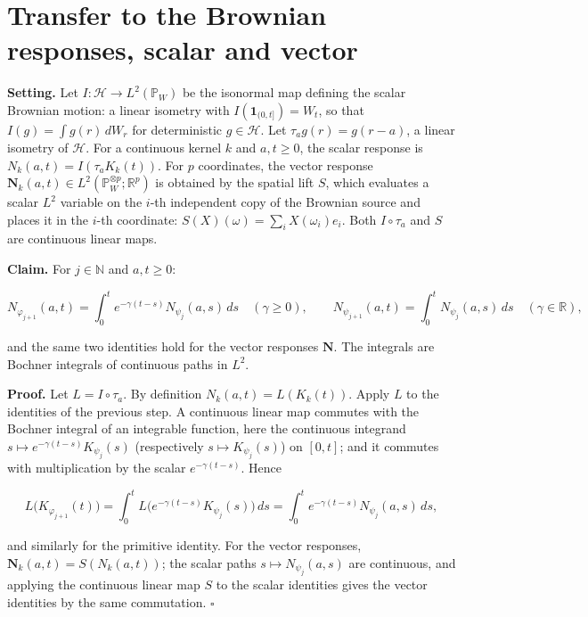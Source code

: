 \documentclass[11pt,a4paper]{article}
\begin{document}
\section{\texorpdfstring{Transfer to the Brownian responses, scalar and vector}{Transfer to the Brownian responses, scalar and vector}}


\textbf{Setting.} Let \(I:\mathcal H\to L^2(\mathbb P_W)\) be the isonormal map defining the scalar Brownian motion: a linear isometry with \(I(\mathbf 1_{(0,t]})=W_t\), so that \(I(g)=\int g(r)\,dW_r\) for deterministic \(g\in\mathcal H\). Let \(\tau_a g(r)=g(r-a)\), a linear isometry of \(\mathcal H\). For a continuous kernel \(k\) and \(a,t\ge0\), the scalar response is \(N_k(a,t)=I(\tau_aK_k(t))\). For \(p\) coordinates, the vector response \(\mathbf N_k(a,t)\in L^2(\mathbb P_W^{\otimes p};\mathbb R^p)\) is obtained by the spatial lift \(S\), which evaluates a scalar \(L^2\) variable on the \(i\)-th independent copy of the Brownian source and places it in the \(i\)-th coordinate: \(S(X)(\omega)=\sum_iX(\omega_i)e_i\). Both \(I\circ\tau_a\) and \(S\) are continuous linear maps.




\textbf{Claim.} For \(j\in\mathbb N\) and \(a,t\ge0\):


\[N_{\varphi_{j+1}}(a,t)=\int_0^te^{-\gamma(t-s)}N_{\psi_j}(a,s)\,ds\quad(\gamma\ge0),\qquad N_{\psi_{j+1}}(a,t)=\int_0^tN_{\psi_j}(a,s)\,ds\quad(\gamma\in\mathbb R),\]


and the same two identities hold for the vector responses \(\mathbf N\). The integrals are Bochner integrals of continuous paths in \(L^2\).




\textbf{Proof.} Let \(L=I\circ\tau_a\). By definition \(N_k(a,t)=L(K_k(t))\). Apply \(L\) to the identities of the previous step. A continuous linear map commutes with the Bochner integral of an integrable function, here the continuous integrand \(s\mapsto e^{-\gamma(t-s)}K_{\psi_j}(s)\) (respectively \(s\mapsto K_{\psi_j}(s)\)) on \([0,t]\); and it commutes with multiplication by the scalar \(e^{-\gamma(t-s)}\). Hence


\[L\bigl(K_{\varphi_{j+1}}(t)\bigr)=\int_0^tL\bigl(e^{-\gamma(t-s)}K_{\psi_j}(s)\bigr)\,ds=\int_0^te^{-\gamma(t-s)}N_{\psi_j}(a,s)\,ds,\]


and similarly for the primitive identity. For the vector responses, \(\mathbf N_k(a,t)=S(N_k(a,t))\); the scalar paths \(s\mapsto N_{\psi_j}(a,s)\) are continuous, and applying the continuous linear map \(S\) to the scalar identities gives the vector identities by the same commutation. \(\square\)
\end{document}
